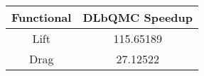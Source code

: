 \begin{tabular}{|c|c|}
\hline
Functional&DLbQMC Speedup\\ 
\hline

Lift & 115.65189\\ 
\hline
Drag & 27.12522\\ 
\hline
\end{tabular}

